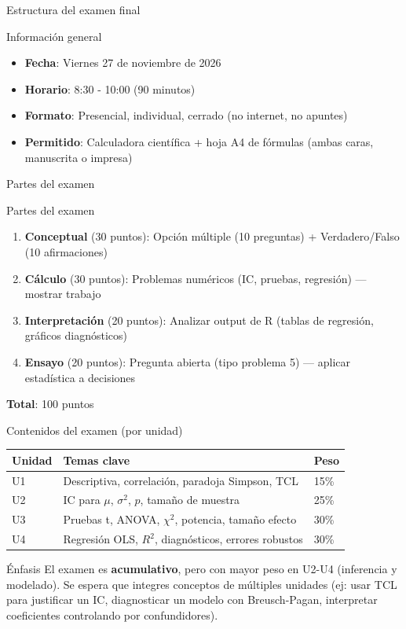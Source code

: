 \documentclass[aspectratio=169, 11pt]{beamer}
\begin{document}
\begin{frame}{Estructura del examen final}
\begin{block}{Información general}
\begin{itemize}
\item \textbf{Fecha}: Viernes 27 de noviembre de 2026
\item \textbf{Horario}: 8:30 - 10:00 (90 minutos)
\item \textbf{Formato}: Presencial, individual, cerrado (no internet, no apuntes)
\item \textbf{Permitido}: Calculadora científica + hoja A4 de fórmulas (ambas caras, manuscrita o impresa)
\end{itemize}
\end{block}
\end{frame}

\begin{frame}{Partes del examen}
\begin{block}{Partes del examen}
\begin{enumerate}
\item \textbf{Conceptual} (30 puntos): Opción múltiple (10 preguntas) + Verdadero/Falso (10 afirmaciones)
\item \textbf{Cálculo} (30 puntos): Problemas numéricos (IC, pruebas, regresión) — mostrar trabajo
\item \textbf{Interpretación} (20 puntos): Analizar output de R (tablas de regresión, gráficos diagnósticos)
\item \textbf{Ensayo} (20 puntos): Pregunta abierta (tipo problema 5) — aplicar estadística a decisiones
\end{enumerate}
\textbf{Total}: 100 puntos
\end{block}
\end{frame}

\begin{frame}{Contenidos del examen (por unidad)}
\begin{center}
\renewcommand{\arraystretch}{1.4}
\begin{tabular}{lll}
\toprule
\textbf{Unidad} & \textbf{Temas clave} & \textbf{Peso} \\
\midrule
U1 & Descriptiva, correlación, paradoja Simpson, TCL & 15\% \\
U2 & IC para $\mu$, $\sigma^2$, $p$, tamaño de muestra & 25\% \\
U3 & Pruebas t, ANOVA, $\chi^2$, potencia, tamaño efecto & 30\% \\
U4 & Regresión OLS, $R^2$, diagnósticos, errores robustos & 30\% \\
\bottomrule
\end{tabular}
\end{center}

\vspace{0.3cm}
\begin{alertblock}{Énfasis}
\small
El examen es \textbf{acumulativo}, pero con mayor peso en U2-U4 (inferencia y modelado). Se espera que integres conceptos de múltiples unidades (ej: usar TCL para justificar un IC, diagnosticar un modelo con Breusch-Pagan, interpretar coeficientes controlando por confundidores).
\end{alertblock}
\end{frame}
\end{document}
